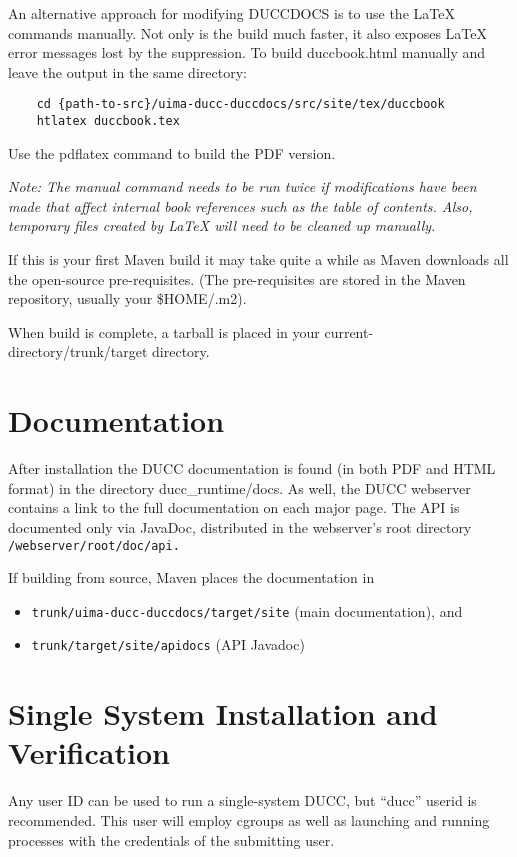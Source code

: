An alternative approach for modifying DUCCDOCS is to use the LaTeX commands manually.
Not only is the build much faster, it also exposes LaTeX error messages lost by the suppression.
To build duccbook.html manually and leave the output in the same directory:
\begin{verbatim}
    cd {path-to-src}/uima-ducc-duccdocs/src/site/tex/duccbook
    htlatex duccbook.tex
\end{verbatim}
Use the pdflatex command to build the PDF version.

{\em Note: The manual command needs to be run twice if modifications have been made that affect internal book
references such as the table of contents. Also, temporary files created by LaTeX will need to be cleaned up manually.}

If this is your first Maven build it may take quite a while as Maven downloads all the
open-source pre-requisites.  (The pre-requisites are stored in the Maven repository, usually
your \$HOME/.m2).

When build is complete, a tarball is placed in your current-directory/trunk/target
directory.

\section{Documentation}
\begin{sloppypar}
After installation the DUCC documentation is found (in both PDF and HTML format) in the directory 
ducc\_runtime/docs.  As well, the DUCC webserver contains a link to the full documentation on each major page.
The API is documented only via JavaDoc, distributed in the webserver's root directory 
{\tt \duccruntime/webserver/root/doc/api.}  
\end{sloppypar}

If building from source, Maven places the documentation in
\begin{itemize}
    \item {\tt trunk/uima-ducc-duccdocs/target/site} (main documentation), and 
    \item {\tt trunk/target/site/apidocs} (API Javadoc)
\end{itemize}

\section{Single System Installation and Verification}

Any user ID can be used to run a single-system DUCC, but ``ducc'' userid is recommended.
This user will employ cgroups as well as launching and running processes with the credentials of the submitting user.

